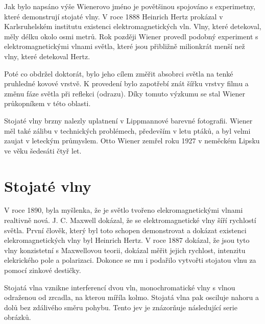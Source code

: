 \documentclass[12pt,a4paper,titlepage,final]{report}
\begin{document}
Jak bylo napsáno výše Wienerovo jméno je povětšinou spojováno s experimetny, které demonstrují stojaté vlny. V roce 1888 Heinrich Hertz
prokázal v Karlsruhelském institutu existenci elektromagnetických vln. Vlny, které detekoval, měly délku okolo osmi metrů. Rok později Wiener
provedl podobný experiment s elektromagnetickými vlnami světla, které jsou přibližně milionkrát menší než vlny, které detekoval Hertz. \cite{encyclopedia_otto}

Poté co obdržel doktorát, bylo jeho cílem změřit absobrci světla na tenké pruhledné kovové vrstvě. K provedení bylo zapotřebí znát šířku
vrstvy filmu a změnu fáze světla při reflekci (odrazu). Díky tomuto výzkumu se stal Wiener průkopníkem v této oblasti. \cite{encyclopedia_otto}

Stojaté vlny brzny nalezly uplatnení v Lippmannové barevné fotografii. Wiener měl také zálibu v technických problémech, především v letu ptáků, 
a byl velmi zaujat v leteckým průmyslem. Otto Wiener zemřel roku 1927 v neměckém Lipsku ve věku šedesáti čtyř let. \cite{wiki_otto}

\section{Stojaté vlny}
V roce 1890, byla myšlenka, že je světlo tvořeno elekromagnetickými
vlnami realtivně nová. J. C. Maxwell dokázal, že se elektromagnetické vlny šíří rychlostí světla. První člověk, který
byl toto schopen demonstrovat a dokázat existenci elekromagnetických vlny byl Heinrich Hertz. V roce 1887 dokázal, že jsou tyto vlny
konzistetní s Maxwellovou teorii, dokázal měřit jejich rychlost,
intenzitu elekrického pole a polarizaci. Dokonce se mu i 
podařilo vytvořti stojatou vlnu za pomocí zinkové destičky. \cite{skullsinthestars}

Stojatá vlna vznikne interferencí dvou vln, monochromatické vlny s vlnou odraženou od zrcadla, na kterou míříla kolmo.
Stojatá vlna pak osciluje nahoru a dolů bez zdálivého směru pohybu. Tento jev je znázorňuje následující serie obrázků.
\end{document}
